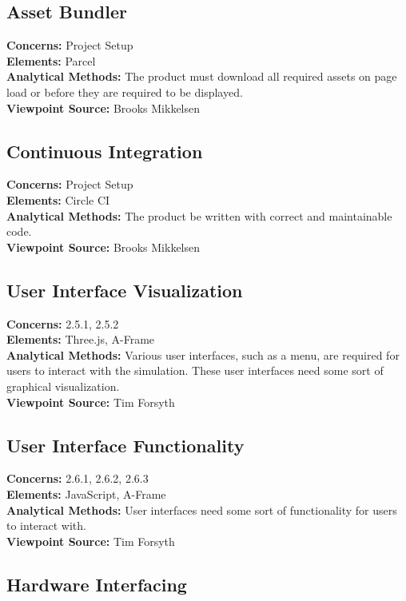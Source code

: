 \documentclass[onecolumn, draftclsnofoot,10pt, compsoc]{IEEEtran}
\begin{document}
\subsection{Asset Bundler}
\textbf{Concerns:} Project Setup\\
\textbf{Elements:} Parcel\\ 
\textbf{Analytical Methods:} The product must download all required assets on page load or before they are required to be displayed.\\
\textbf{Viewpoint Source:} Brooks Mikkelsen

\subsection{Continuous Integration}
\textbf{Concerns:} Project Setup\\
\textbf{Elements:} Circle CI\\
\textbf{Analytical Methods:} The product be written with correct and maintainable code.\\
\textbf{Viewpoint Source:} Brooks Mikkelsen

\subsection{User Interface Visualization}
\textbf{Concerns:} 2.5.1, 2.5.2\\
\textbf{Elements:} Three.js, A-Frame\\
\textbf{Analytical Methods:} Various user interfaces, such as a menu, are required for users to interact with the simulation. These user interfaces need some sort of graphical visualization.\\
\textbf{Viewpoint Source:} Tim Forsyth

\subsection{User Interface Functionality}
\textbf{Concerns:} 2.6.1, 2.6.2, 2.6.3\\
\textbf{Elements:} JavaScript, A-Frame\\
\textbf{Analytical Methods:} User interfaces need some sort of functionality for users to interact with.\\
\textbf{Viewpoint Source:} Tim Forsyth

\subsection{Hardware Interfacing}
\end{document}
